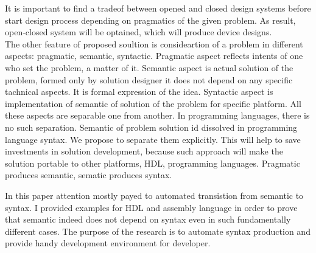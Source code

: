 It is important to find a tradeof between opened and closed design systems before start design process depending on pragmatics of the given problem. As result, open-closed system will be optained, which will produce device designs.\\
The other feature of proposed soultion is consideartion of a problem in different aspects: pragmatic, semantic, syntactic. Pragmatic aspect reflects intents of one who set the problem, a matter of it. Semantic aspect is actual solution of the problem, formed only by solution designer it does not depend on any specific tachnical aspects. It is formal expression of the idea. Syntactic aspect is implementation of semantic of solution of the problem for specific platform. All these aspects are separable one from another. In programming languages, there is no such separation. Semantic of problem solution id dissolved in programming language syntax. We propose to separate them explicitly. This will help to save investments in solution development, because such approach will make the solution portable to other platforms, HDL, programming languages. Pragmatic produces semantic, sematic produces syntax.

In this paper attention mostly payed to automated transistion from semantic to syntax. I provided examples for HDL and assembly language in order to prove that semantic indeed does not depend on syntax even in such fundamentally different cases. The purpose of the research is to automate syntax production and provide handy development environment for developer.
